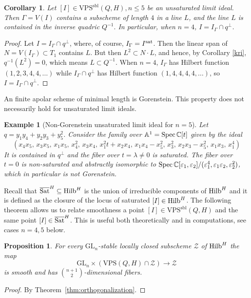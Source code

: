 \documentclass{amsart}
\newcommand{\Hilb}{{\rm{Hilb}}}
\newcommand{\Satbar}{\overline{\rm{Sat}}}
\newcommand{\Spec}{{\rm{Spec}}\,}
\newcommand{\CC}{{\mathbb C}}
\newcommand{\VPSsbl}{{\mathrm{VPS}}^{\mathrm{sbl}}(Q, H)}
\newcommand{\VPS}{\mathrm{VPS}(Q, H)}
\newcommand{\GL}{\mathrm{GL}}%
\newtheorem{proposition}[lemma]{\bf Proposition}
\newtheorem{corollary}[lemma]{\bf Corollary}
\newtheorem{example}[lemma]{\bf Example}
\begin{document}
\begin{corollary}\label{linesinquadric} Let $[I]\in \VPSsbl, n\leq 5$ be an unsaturated limit ideal. Then $\Gamma=V(I)$ contains a subscheme of length  $4$ in a line $L$, and the line $L$ is contained in the inverse quadric $Q^{-1}.$  In particular, when $n=4$,  $I=I_\Gamma\cap q^\perp$.
\end{corollary}
\begin{proof}  Let $I=I_\Gamma\cap q^\perp$, where, of course, $I_\Gamma=I^{\rm sat}$.
Then the linear span of $N=V(I_\Gamma)\subset T_1$ contains $L$.
But then $L^2\subset N\cdot L$, and hence, by Corollary \ref{kri},
$q^{-1}(L^2)=0$, which means $L\subset Q^{-1}$. When $n=4$, $I_\Gamma$ has
Hilbert function $(1,2,3,4,4, \ldots )$ while $I_\Gamma\cap q^\perp$ has
Hilbert function $(1,4,4,4,4, \ldots )$, so $I=I_\Gamma\cap q^\perp$.
\end{proof}
An finite apolar scheme of minimal length is Gorenstein.  This property does not necessarily hold for unsaturated limit ideals.  
\begin{example}[Non-Gorenstein unsaturated limit ideal for $n=5$]\label{ex:nonGorenstein}
    Let $q = y_1y_4 + y_2y_3 + y_5^2$. Consider the family over $\mathbb{A}^1
    = \Spec \CC[t]$ given by the ideal
    \[
        \left(x_{4}x _{5},\,x_{3}x_{5},\,x_{1}x_{5},\,x_{4}^{2
        },\,x_{3}x_{4},\,x_{1}^2t + x_{2}x_{4},\,x_{1}x_{4}-x_{
        5}^{2},\,x_{3}^{2},\,x_{2}x_{3}-x_{5}^{2},\,
        x_{1}x_{3},\,x_{1}^{4}\right)
    \]
    It is contained in $q^\perp$ and the fiber over $t=\lambda\neq 0$ is
    saturated. The fiber over $t = 0$ is non-saturated and abstractly
    isomorphic to $\Spec \CC[\varepsilon_1, \varepsilon_2]/(\varepsilon_1^4,
    \varepsilon_1\varepsilon_2, \varepsilon_2^2)$, which in particular is not
    Gorenstein.
\end{example}

Recall that $\Satbar^H \subseteq \Hilb^H$ is the union of irreducible components of
$\Hilb^H$ and it is defined as the closure of the locus of saturated $[I]\in \Hilb^H$.
The following theorem allows us to relate smoothness
a point $[I]\in \VPSsbl$ and the same point $[I]\in \Satbar^H$. This is useful both theoretically
and in computations, see cases $n=4,5$ below.
\begin{proposition}\label{ref:smoothness}
    For every $\GL_n$-stable locally closed subscheme $\mathcal{Z}$ of
    $\Hilb^H$ the map
    \[
        \GL_n \times (\VPS\cap \mathcal{Z})\to \mathcal{Z}
    \]
    is smooth and has $\binom{n+1}{2}$-dimensional fibers.
\end{proposition}
\begin{proof}
    By Theorem~\ref{thm:orthogonalization}.
\end{proof}
\end{document}
